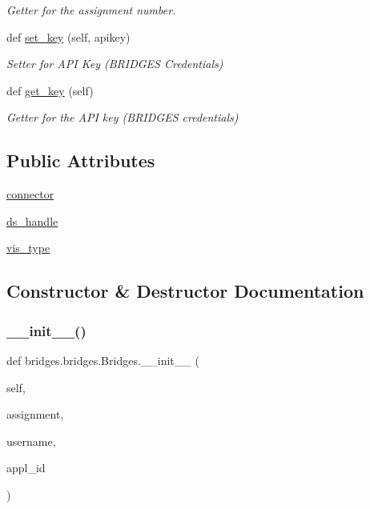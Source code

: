 \begin{DoxyCompactItemize}
\begin{DoxyCompactList}\small\item\em Getter for the assignment number. \end{DoxyCompactList}\item 
def \hyperlink{classbridges_1_1bridges_1_1_bridges_a5841bc54e3663249e76f4b34f5a3a593}{set\+\_\+key} (self, apikey)
\begin{DoxyCompactList}\small\item\em Setter for A\+PI Key (B\+R\+I\+D\+G\+ES Credentials) \end{DoxyCompactList}\item 
def \hyperlink{classbridges_1_1bridges_1_1_bridges_afcdb0291c535b41fb7be31eaf5bf3677}{get\+\_\+key} (self)
\begin{DoxyCompactList}\small\item\em Getter for the A\+PI key (B\+R\+I\+D\+G\+ES credentials) \end{DoxyCompactList}\end{DoxyCompactItemize}
\subsection*{Public Attributes}
\begin{DoxyCompactItemize}
\item 
\hyperlink{classbridges_1_1bridges_1_1_bridges_a1c02ee44e7a4a3ee2f7d9c7d7da7d09f}{connector}
\item 
\hyperlink{classbridges_1_1bridges_1_1_bridges_a7a6f25612be64d4f3e203d7d37cb4da4}{ds\+\_\+handle}
\item 
\hyperlink{classbridges_1_1bridges_1_1_bridges_a5ca152bf3830e2be1f72247463916f82}{vis\+\_\+type}
\end{DoxyCompactItemize}


\subsection{Constructor \& Destructor Documentation}
\mbox{\label{classbridges_1_1bridges_1_1_bridges_af174072883f6f269a9fe7cc02e12c276}} 
\subsubsection{\texorpdfstring{\+\_\+\+\_\+init\+\_\+\+\_\+()}{\_\_init\_\_()}}
{\footnotesize\ttfamily def bridges.\+bridges.\+Bridges.\+\_\+\+\_\+init\+\_\+\+\_\+ (\begin{DoxyParamCaption}\item[{}]{self,  }\item[{}]{assignment,  }\item[{}]{username,  }\item[{}]{appl\+\_\+id }\end{DoxyParamCaption})}



